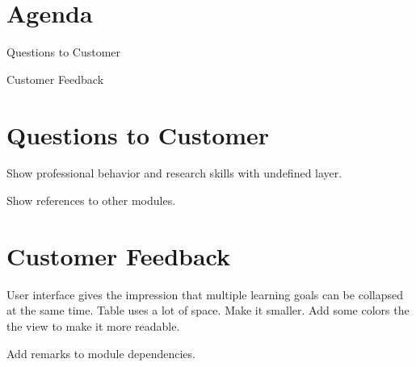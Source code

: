 \documentclass[11pt]{meetingmins}
\begin{document}
\maketitle

\section{Agenda}
\begin{hiddenitems}
	\item Questions to Customer
	\item Customer Feedback
\end{hiddenitems}

\section{Questions to Customer}
Show professional behavior and research skills with undefined layer.

Show references to other modules.



\section{Customer Feedback}
User interface gives the impression that multiple learning goals can be collapsed at the same time.
Table uses a lot of space. Make it smaller.
Add some colors the the view to make it more readable.

Add remarks to module dependencies.
\end{document}
